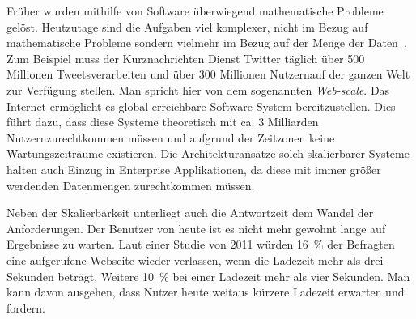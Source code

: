 Früher wurden mithilfe von Software überwiegend mathematische Probleme gelöst. Heutzutage sind die Aufgaben viel komplexer, nicht im Bezug auf mathematische Probleme sondern vielmehr im Bezug auf der Menge der Daten~\cite[S.~18]{kuhn_reactive_2015}. Zum Beispiel muss der Kurznachrichten Dienst Twitter täglich über 500 Millionen Tweets\footnotemark[1] verarbeiten und über 300 Millionen Nutzern\footnotemark[2] auf der ganzen Welt zur Verfügung stellen. Man spricht hier von dem sogenannten \textit{Web-scale}. Das Internet ermöglicht es global erreichbare Software System bereitzustellen. Dies führt dazu, dass diese Systeme theoretisch mit ca. 3 Milliarden Nutzern\footnotemark[3] zurechtkommen müssen und aufgrund der Zeitzonen keine Wartungszeiträume existieren. Die Architekturansätze solch skalierbarer Systeme halten auch Einzug in Enterprise Applikationen, da diese mit immer größer werdenden Datenmengen zurechtkommen müssen.


\pagebreak

Neben der Skalierbarkeit unterliegt auch die Antwortzeit dem Wandel der Anforderungen. Der Benutzer von heute ist es nicht mehr gewohnt lange auf Ergebnisse zu warten. Laut einer Studie von 2011 würden 16~\% der Befragten eine aufgerufene Webseite wieder verlassen, wenn die Ladezeit mehr als drei Sekunden beträgt. Weitere 10~\% bei einer Ladezeit mehr als vier Sekunden\footnotemark[4]. Man kann davon ausgehen, dass Nutzer heute weitaus kürzere Ladezeit erwarten und fordern.\\


